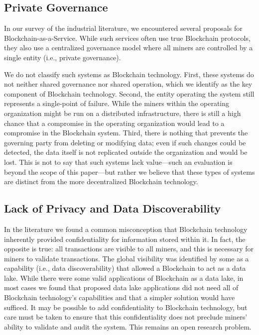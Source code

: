 \subsection{Private Governance}
\label{sec:private-blockchain}
In our survey of the industrial literature, we encountered several proposals for Blockchain-as-a-Service.
While such services often use true Blockchain protocols, they also use a centralized governance model where all miners are controlled by a single entity (i.e., private governance).

We do not classify such systems as Blockchain technology.
First, these systems do not neither shared governance nor shared operation, which we identify as the key component of Blockchain technology.
Second, the entity operating the system still represents a single-point of failure.
While the miners within the operating organization might be run on a distributed infrastructure, there is still a high chance that a compromise in the operating organization would lead to a compromise in the Blockchain system.
Third, there is nothing that prevents the governing party from deleting or modifying data; even if such changes could be detected, the data itself is not replicated outside the organization and would be lost.
This is not to say that such systems lack value---such an evaluation is beyond the scope of this paper---but rather we believe that these types of systems are distinct from the more decentralized Blockchain technology.

\subsection{Lack of Privacy and Data Discoverability}
In the literature we found a common misconception that Blockchain technology inherently provided confidentiality for information stored within it.
In fact, the opposite is true: all transactions are visible to all miners, and this is necessary for miners to validate transactions.
The global visibility was identified by some as a capability (i.e., data discoverability) that allowed a Blockchain to act as a data lake.
While there were some valid applications of Blockchain as a data lake, in most cases we found that proposed data lake applications did not need all of Blockchain technology's capabilities and that a simpler solution would have sufficed.
It may be possible to add confidentiality to Blockchain technology, but care must be taken to ensure that this confidentiality does not preclude miners' ability to validate and audit the system.
This remains an open research problem.

